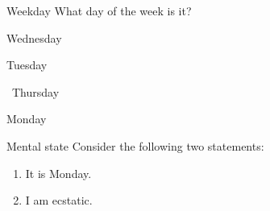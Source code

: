 \documentclass{article}
\begin{document}
  \begin{examtronproblem}{Weekday}
    What day of the week is it?
    \begin{examtronchoices}
      \item Wednesday
      \item Tuesday
      \item \correct\ Thursday
      \item Monday
    \end{examtronchoices}
  \end{examtronproblem}

  \begin{examtronproblem}{Mental state}
    Consider the following two statements:
    \begin{enumerate}[(1)]
      \item It is Monday.
      \item I am ecstatic.
    \end{enumerate}
  \end{examtronproblem}
\end{document}
